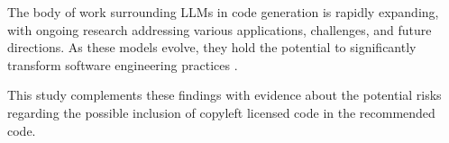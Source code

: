 
The body of work surrounding LLMs in code generation is rapidly expanding, with ongoing research addressing various applications, challenges, and future directions. As these models evolve, they hold the potential to significantly transform software engineering practices \cite{Fan:LlmSeSurveyProblems:ICSE-FoSE:2023,Hou:SurveyLlmSe:TOSEM:2024}.

This study complements these findings with evidence about the potential risks
regarding the possible inclusion of copyleft licensed code in the recommended code.





